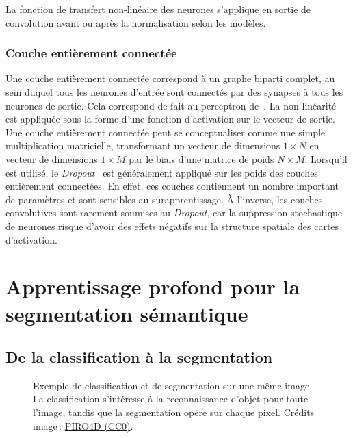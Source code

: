 La fonction de transfert non-linéaire des neurones s'applique en sortie de convolution avant ou après la normalisation selon les modèles.

\subsubsection{Couche entièrement connectée}

Une couche entièrement connectée correspond à un graphe biparti complet, au sein duquel tous les neurones d'entrée sont connectés par des synapses à tous les neurones de sortie. Cela correspond de fait au perceptron de~\citet{rosenblatt_perceptron_1957}. La non-linéarité est appliquée sous la forme d'une fonction d'activation sur le vecteur de sortie. Une couche entièrement connectée peut se conceptualiser comme une simple multiplication matricielle, transformant un vecteur de dimensions $1\times{}N$ en vecteur de dimensions $1\times{}M$ par le biais d'une matrice de poids $N\times{}M$. Lorsqu'il est utilisé, le \emph{Dropout}~\cite{srivastava_dropout_2014} est généralement appliqué sur les poids des couches entièrement connectées. En effet, ces couches contiennent un nombre important de paramètres et sont sensibles au surapprentissage. À l'inverse, les couches convolutives sont rarement soumises au \emph{Dropout}, car la suppression stochastique de neurones risque d'avoir des effets négatifs sur la structure spatiale des cartes d'activation.

\section{Apprentissage profond pour la segmentation sémantique}

\subsection{De la classification à la segmentation}

\begin{figure}[t]
  \resizebox{\textwidth}{!}{}
  \caption{Exemple de classification et de segmentation sur une même image. La classification s'intéresse à la reconnaissance d'objet pour toute l'image, tandis que la segmentation opère sur chaque pixel. {\small Crédits image\,: \href{https://pixabay.com/en/balloon-hot-air-balloon-ride-mission-2331488/}{PIRO4D (CC0)}}.}
  \label{fig:classif_vs_seg}
\end{figure}

